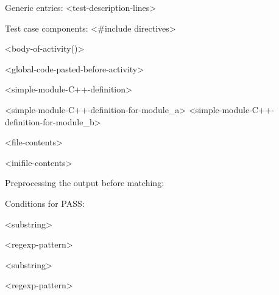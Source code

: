 \begin{filelisting}
Generic entries:
   <test-description-lines>

Test case components:
   <#include directives>

   <body-of-activity()>

   <global-code-pasted-before-activity>

   <simple-module-C++-definition>

   <simple-module-C++-definition-for-module_a>
   <simple-module-C++-definition-for-module_b>

   <file-contents>

   <inifile-contents>

Preprocessing the output before matching:

Conditions for PASS:


   <substring>

   <regexp-pattern>

   <substring>

   <regexp-pattern>


\end{filelisting}



